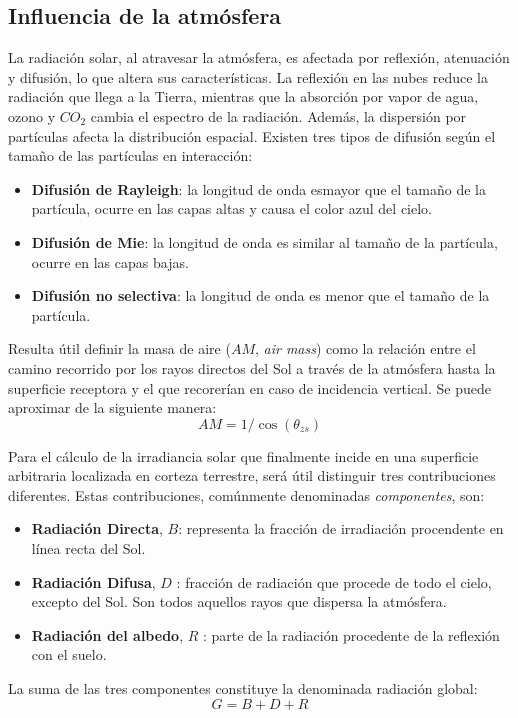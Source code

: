 \subsection{Influencia de la atmósfera}
\label{sec:org6a4f548}
La radiación solar, al atravesar la atmósfera, es afectada por reflexión, atenuación y difusión, lo que altera sus características. La reflexión en las nubes reduce la radiación que llega a la Tierra, mientras que la absorción por vapor de agua, ozono y \(CO_2\) cambia el espectro de la radiación. Además, la dispersión por partículas afecta la distribución espacial. Existen tres tipos de difusión según el tamaño de las partículas en interacción:
\begin{itemize}
\item \textbf{Difusión de Rayleigh}: la longitud de onda esmayor que el tamaño de la partícula, ocurre en las capas altas y causa el color azul del cielo.
\item \textbf{Difusión de Mie}: la longitud de onda es similar al tamaño de la partícula, ocurre en las capas bajas.
\item \textbf{Difusión no selectiva}: la longitud de onda es menor que el tamaño de la partícula.
\end{itemize}

Resulta útil definir la masa de aire (\(AM\), \emph{air mass}) como la relación entre el camino recorrido por los rayos directos del Sol a través de la atmósfera hasta la superficie receptora y el que recorerían en caso de incidencia vertical. Se puede aproximar de la siguiente manera: 
\begin{equation}
AM = 1/\cos(\theta_{zs})
\end{equation}

Para el cálculo de la irradiancia solar que finalmente incide en una superficie arbitraria localizada en corteza terrestre, será útil distinguir tres contribuciones diferentes. Estas contribuciones, comúnmente denominadas \emph{componentes}, son:
\begin{itemize}
\item \textbf{Radiación Directa}, \(B\): representa la fracción de irradiación procendente en línea recta del Sol. 
\item \textbf{Radiación Difusa}, \(D\) : fracción de radiación que procede de todo el cielo, excepto del Sol. Son todos aquellos rayos que dispersa la atmósfera.
\item \textbf{Radiación del albedo}, \(R\) : parte de la radiación procedente de la reflexión con el suelo.
\end{itemize}
La suma de las tres componentes constituye la denominada radiación global: 
\begin{equation}
G = B + D + R
\label{eq:comp_rad}
\end{equation}


